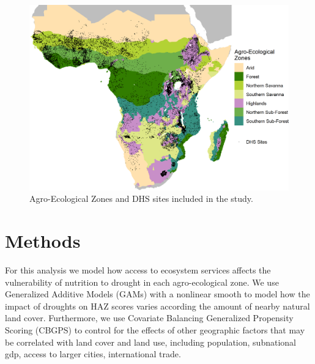 \documentclass{article}
\begin{document}
\begin{figure}[h]
	\centering
	\includegraphics[width=0.8\linewidth]{AEZ_Sites.png}
	\caption{Agro-Ecological Zones and DHS sites included in the study.}
	\label{fig:AEZmap}
\end{figure}

\section{Methods}
For this analysis we model how access to ecosystem services affects the vulnerability of nutrition to drought in each agro-ecological zone.  We use Generalized Additive Models (GAMs) with a nonlinear smooth to model how the impact of droughts on HAZ scores varies according the amount of nearby natural land cover.  Furthermore, we use Covariate Balancing Generalized Propensity Scoring (CBGPS) to control for the effects of other geographic factors that may be correlated with land cover and land use, including population, subnational gdp, access to larger cities, international trade.
\end{document}
